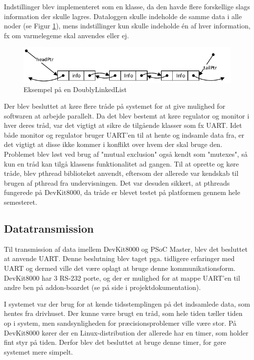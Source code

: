 Indstillinger blev implementeret som en klasse, da den havde flere forskellige slags information der skulle lagres. Dataloggen skulle indeholde de samme data i alle noder (se Figur \ref{fig:DoublyLinkedList}), mens indstillinger kun skulle indeholde én af hver information, fx om varmelegeme skal anvendes eller ej.

\clearpage

\begin{figure}[ht]
\centering
\includegraphics[width=\textwidth - 1 cm]{../fig/linkedNodes.pdf}
\caption{Eksempel på en DoublyLinkedList}
\label{fig:DoublyLinkedList}
\end{figure}

Der blev besluttet at køre flere tråde på systemet for at give mulighed for softwaren at arbejde parallelt. 
Da det blev bestemt at køre regulator og monitor i hver deres tråd, var det vigtigt at sikre de tilgående klasser som fx UART. 
Idet både monitor og regulator bruger UART'en til at hente og indsamle data fra, er det vigtigt at disse ikke kommer i konflikt over hvem der skal bruge den. Problemet blev løst ved brug af "mutual exclusion" også kendt som "mutexes", så kun en tråd kan tilgå klassens funktionalitet ad gangen. 
Til at oprette og køre tråde, blev pthread biblioteket anvendt, eftersom der allerede var kendskab til brugen af pthread fra undervisningen. 
Det var desuden sikkert, at pthreads fungerede på DevKit8000, da tråde er blevet testet på platformen gennem hele semesteret.

\subsection{Datatransmission}

Til transmission af data imellem DevKit8000 og PSoC Master, blev det besluttet at anvende UART. 
Denne beslutning blev taget pga. tidligere erfaringer med UART og dermed ville det være oplagt at bruge denne kommunikationsform. 
DevKit8000 har 3 RS-232 porte, og der er mulighed for at mappe UART'en til andre ben på addon-boardet (se  på side \pageref{P-sec:uart_impl_opsatning} i projektdokumentation).

I systemet var der brug for at kende tidsstemplingen på det indsamlede data, som hentes fra drivhuset. Der kunne være brugt en tråd, som hele tiden tæller tiden op i system, men sandsynligheden for præcisionsproblemer ville være stor. 
På DevKit8000 kører der en Linux-distribution der allerede har en timer, som holder fint styr på tiden. Derfor blev det besluttet at bruge denne timer, for gøre systemet mere simpelt.

